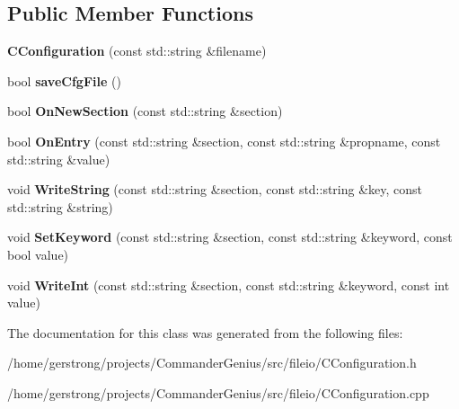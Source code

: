 \subsection*{Public Member Functions}
\begin{DoxyCompactItemize}
\item 
\hypertarget{class_c_configuration_ae6f19141d3290cb2b92ab7913b4bca5c}{
{\bfseries CConfiguration} (const std::string \&filename)}
\label{class_c_configuration_ae6f19141d3290cb2b92ab7913b4bca5c}

\item 
\hypertarget{class_c_configuration_a8593c4b77579d0fe8a05523f7d94130f}{
bool {\bfseries saveCfgFile} ()}
\label{class_c_configuration_a8593c4b77579d0fe8a05523f7d94130f}

\item 
\hypertarget{class_c_configuration_ad352178c06875cba7aa23d444fc33d33}{
bool {\bfseries OnNewSection} (const std::string \&section)}
\label{class_c_configuration_ad352178c06875cba7aa23d444fc33d33}

\item 
\hypertarget{class_c_configuration_a70dd418beeefb92ba3b78deae062a369}{
bool {\bfseries OnEntry} (const std::string \&section, const std::string \&propname, const std::string \&value)}
\label{class_c_configuration_a70dd418beeefb92ba3b78deae062a369}

\item 
\hypertarget{class_c_configuration_a2e1c06e80fc0cb92b79258ae2c037fb9}{
void {\bfseries WriteString} (const std::string \&section, const std::string \&key, const std::string \&string)}
\label{class_c_configuration_a2e1c06e80fc0cb92b79258ae2c037fb9}

\item 
\hypertarget{class_c_configuration_a7a9675b85fa3b655d88a5020aec43242}{
void {\bfseries SetKeyword} (const std::string \&section, const std::string \&keyword, const bool value)}
\label{class_c_configuration_a7a9675b85fa3b655d88a5020aec43242}

\item 
\hypertarget{class_c_configuration_aef4dc1a3dd3f182b870f6f97652761f9}{
void {\bfseries WriteInt} (const std::string \&section, const std::string \&keyword, const int value)}
\label{class_c_configuration_aef4dc1a3dd3f182b870f6f97652761f9}

\end{DoxyCompactItemize}


The documentation for this class was generated from the following files:\begin{DoxyCompactItemize}
\item 
/home/gerstrong/projects/CommanderGenius/src/fileio/CConfiguration.h\item 
/home/gerstrong/projects/CommanderGenius/src/fileio/CConfiguration.cpp\end{DoxyCompactItemize}
